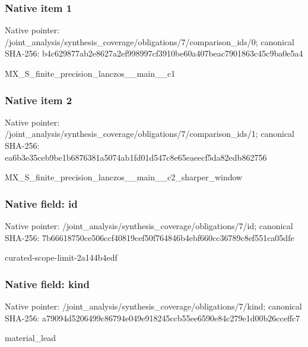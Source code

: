 \documentclass[10pt,a4paper]{article}
\begin{document}
\subsubsection{Native item 1}
Native pointer: /joint\_\allowbreak{}analysis/synthesis\_\allowbreak{}coverage/obligations/7/comparison\_\allowbreak{}ids/0; canonical SHA-256: b4c629877ab2e8627a2ef998997cf3910be60a407beac7901863c45c9ba0e5a4

\begingroup\raggedright\sloppy MX\_\allowbreak{}S\_\allowbreak{}finite\_\allowbreak{}precision\_\allowbreak{}lanczos\_\allowbreak{}\_\allowbreak{}main\_\allowbreak{}\_\allowbreak{}c1\par\endgroup

\subsubsection{Native item 2}
Native pointer: /joint\_\allowbreak{}analysis/synthesis\_\allowbreak{}coverage/obligations/7/comparison\_\allowbreak{}ids/1; canonical SHA-256: ea6b3e35ceb9be1b6876381a5074ab1fd01d547c8e65eaeecf5da82edb862756

\begingroup\raggedright\sloppy MX\_\allowbreak{}S\_\allowbreak{}finite\_\allowbreak{}precision\_\allowbreak{}lanczos\_\allowbreak{}\_\allowbreak{}main\_\allowbreak{}\_\allowbreak{}c2\_\allowbreak{}sharper\_\allowbreak{}window\par\endgroup

\subsubsection{Native field: id}
Native pointer: /joint\_\allowbreak{}analysis/synthesis\_\allowbreak{}coverage/obligations/7/id; canonical SHA-256: 7b66618750ce506ccf40819cef50f764846b4ebf660cc36789c8ef551ca05dfe

\begingroup\raggedright\sloppy curated-scope-limit-2a144b4edf\par\endgroup

\subsubsection{Native field: kind}
Native pointer: /joint\_\allowbreak{}analysis/synthesis\_\allowbreak{}coverage/obligations/7/kind; canonical SHA-256: a79094d5206499c86794e049e918245ccb55ee6590e84c279e1d00b26cceffc7

\begingroup\raggedright\sloppy material\_\allowbreak{}lead\par\endgroup
\end{document}
